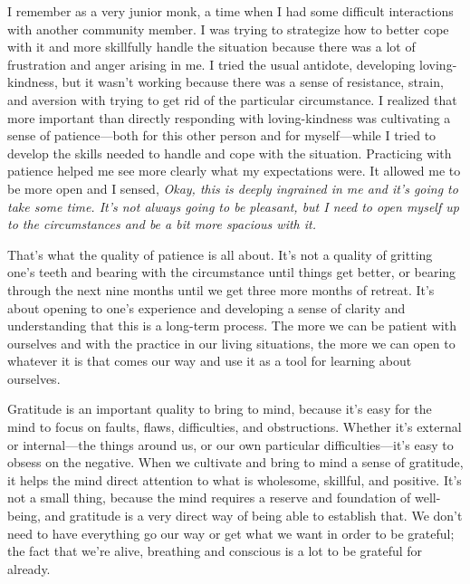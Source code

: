 I remember as a very junior monk, a time when I had some difficult 
interactions with another community member. I was trying to strategize 
how to better cope with it and more skillfully handle the situation 
because there was a lot of frustration and anger arising in me. I tried 
the usual antidote, developing loving-kindness, but it wasn't working 
because there was a sense of resistance, strain, and aversion with 
trying to get rid of the particular circumstance. I realized that more 
important than directly responding with loving-kindness was cultivating 
a sense of patience---both for this other person and for myself---while 
I tried to develop the skills needed to handle and cope with the 
situation. Practicing with patience helped me see more clearly what my 
expectations were. It allowed me to be more open and I sensed, 
\emph{Okay, this is deeply ingrained in me and it's going to take some 
time. It's not always going to be pleasant, but I need to open myself 
up to the circumstances and be a bit more spacious with it.}

That's what the quality of patience is all about. It's not a quality of 
gritting one's teeth and bearing with the circumstance until things get 
better, or bearing through the next nine months until we get three more 
months of retreat. It's about opening to one's experience and 
developing a sense of clarity and understanding that this is a 
long-term process. The more we can be patient with ourselves and with 
the practice in our living situations, the more we can open to whatever 
it is that comes our way and use it as a tool for learning about 
ourselves.


Gratitude is an important quality to bring to mind, because it's easy 
for the mind to focus on faults, flaws, difficulties, and obstructions. 
Whether it's external or internal---the things around us, or our own 
particular difficulties---it's easy to obsess on the negative. When we 
cultivate and bring to mind a sense of gratitude, it helps the mind 
direct attention to what is wholesome, skillful, and positive. It's not 
a small thing, because the mind requires a reserve and foundation of 
well-being, and gratitude is a very direct way of being able to 
establish that. We don't need to have everything go our way or get what 
we want in order to be grateful; the fact that we're alive, breathing 
and conscious is a lot to be grateful for already.

